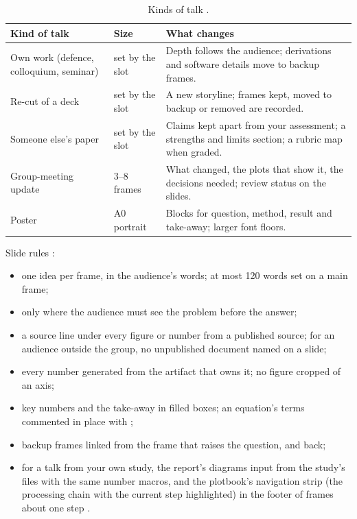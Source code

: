 \begin{table}[H]
  \small
  \begin{tabularx}{\textwidth}{L{0.24\textwidth}L{0.18\textwidth}Y}
    \toprule
    Kind of talk & Size & What changes \\
    \midrule
    Own work (defence, colloquium, seminar) & set by the slot & Depth follows the audience;
    derivations and software details move to backup frames. \\
    Re-cut of a deck & set by the slot & A new storyline; frames kept, moved to backup or removed are
    recorded. \\
    Someone else's paper & set by the slot & Claims kept apart from your assessment; a
    strengths and limits section; a rubric map when graded. \\
    Group-meeting update & 3--8 frames & What changed, the plots that show it, the decisions
    needed; review status on the slides. \\
    Poster & A0 portrait & Blocks for question, method, result and take-away; larger font floors. \\
    \bottomrule
  \end{tabularx}
  \caption{Kinds of talk \cite[Kinds of talk]{skill:deck-production}.}
  \label{tab:talks-kinds}
\end{table}

Slide rules \cite[Slide rules]{skill:deck-production}:
\begin{itemize}
  \item one idea per frame, in the audience's words; at most 120 words set on a main frame;
  \item \code{\\pause} only where the audience must see the problem before the answer;
  \item a \code{\\scriptsize} source line under every figure or number from a published
        source; for an audience outside the group, no unpublished document named on a slide;
  \item every number generated from the artifact that owns it; no figure cropped of an axis;
  \item key numbers and the take-away in filled boxes; an equation's terms commented in place
        with \code{\\underbrace};
  \item backup frames linked from the frame that raises the question, and back;
  \item for a talk from your own study, the report's diagrams input from the study's
         files with the same number macros, and the plotbook's navigation strip
        (the processing chain with the current step highlighted) in the footer of frames about
        one step \cite[Diagrams and navigation]{skill:deck-production}.
\end{itemize}

